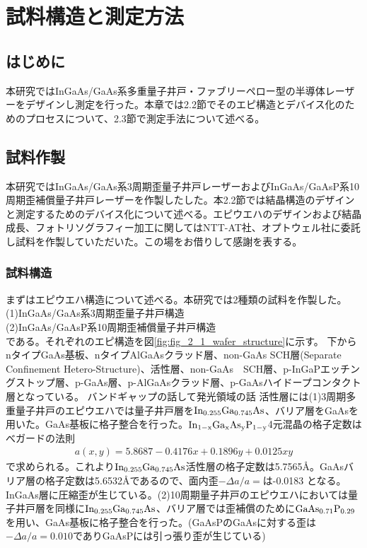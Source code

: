 
\chapter{試料構造と測定方法}%
\section{はじめに}%
本研究ではInGaAs/GaAs系多重量子井戸・ファブリーペロー型の半導体レーザーをデザインし測定を行った。本章では2.2節でそのエピ構造とデバイス化のためのプロセスについて、2.3節で測定手法について述べる。
\section{試料作製}%
本研究ではInGaAs/GaAs系3周期歪量子井戸レーザーおよびInGaAs/GaAsP系10周期歪補償量子井戸レーザーを作製したした。本2.2節では結晶構造のデザインと測定するためのデバイス化について述べる。エピウエハのデザインおよび結晶成長、フォトリソグラフィー加工に関してはNTT-AT社、オプトウェル社に委託し試料を作製していただいた。この場をお借りして感謝を表する。

\subsection{試料構造}%
まずはエピウエハ構造について述べる。本研究では2種類の試料を作製した。\\
(1)InGaAs/GaAs系3周期歪量子井戸構造\\
(2)InGaAs/GaAsP系10周期歪補償量子井戸構造\\
である。それぞれのエピ構造を図\ref{fig:fig_2_1_wafer_structure}に示す。
下からnタイプGaAs基板、nタイプAlGaAsクラッド層、non-GaAs SCH層(Separate Confinement Hetero-Structure)、活性層、non-GaAs　SCH層、p-InGaPエッチングストップ層、p-GaAs層、p-AlGaAsクラッド層、p-GaAsハイドープコンタクト層となっている。
バンドギャップの話して発光領域の話
活性層には(1)3周期多重量子井戸のエピウエハでは量子井戸層を$\rm{In_{0.255}Ga_{0.745}As}$、バリア層をGaAsを用いた。GaAs基板に格子整合を行った。$\rm{In_{1-x}Ga_{x}As_{y}P_{1-y}}$4元混晶の格子定数はべガードの法則
\begin{eqnarray}
a(x,y)=5.8687-0.4176x+0.1896y+0.0125xy
\end{eqnarray}
で求められる\cite{ref_iga}。これより$\rm{In_{0.255}Ga_{0.745}As}$活性層の格子定数は5.7565\AA 。GaAsバリア層の格子定数は5.6532\AA であるので、面内歪$-\Delta a/a=$は-0.0183 となる。InGaAs層に圧縮歪が生じている。(2)10周期量子井戸のエピウエハにおいては量子井戸層を同様に$\rm{In_{0.255}Ga_{0.745}As}$、バリア層では歪補償のために$\rm{GaAs_{0.71}P_{0.29}}$を用い、GaAs基板に格子整合を行った。(GaAsPのGaAsに対する歪は$-\Delta a/a=0.010$でありGaAsPには引っ張り歪が生じている)

